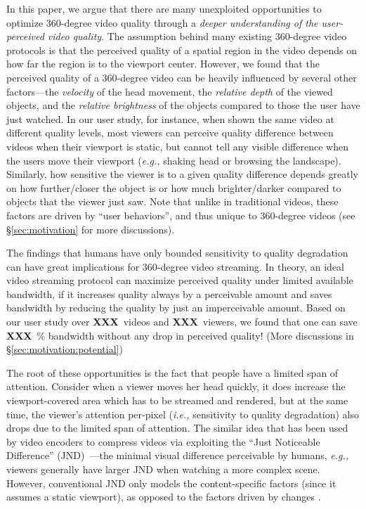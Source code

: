 \documentclass[sigconf]{acmart}
\newcommand{\fillme}{{\bf XXX}~}
\newcommand{\eg}{{\it e.g.,}\xspace}
\newcommand{\ie}{{\it i.e.,}\xspace}
\begin{document}
In this paper, we argue that there are many unexploited opportunities to optimize 360-degree video quality through a {\em deeper understanding of the user-perceived video quality}.
The assumption behind many existing 360-degree video protocols is that the perceived quality of a spatial region in the video depends on how far the region is to the viewport center.
However, we found that the perceived quality of a 360-degree video can be heavily influenced by several other factors---the {\em velocity} of the head movement, the {\em relative depth} of the viewed objects, and the {\em relative brightness} of the objects compared to those the user have just watched. 
In our user study, for instance, when shown the same video at different quality levels, most viewers can perceive quality difference between videos when their viewport is static, but cannot tell any visible difference when the users move their viewport (\eg shaking head or browsing the landscape).
Similarly, how sensitive the viewer is to a given quality difference depends greatly on how further/closer the object is or how much brighter/darker compared to objects that the viewer just saw.
Note that unlike in traditional videos, these factors are driven by ``user behaviors'', and thus unique to 360-degree videos (see \S\ref{sec:motivation} for more discussions).


The findings that humans have only bounded sensitivity to quality degradation can have great implications for 360-degree video streaming. 
In theory, an ideal video streaming protocol can maximize perceived quality under limited available bandwidth, if it increases quality always by a perceivable amount and saves bandwidth by reducing the quality by just an imperceivable amount. 
Based on our user study over \fillme videos and \fillme viewers, we found that one can save \fillme\% bandwidth without any drop in perceived quality! (More discussions in \S\ref{sec:motivation:potential})


The root of these opportunities is the fact that people have a limited span of attention.
Consider when a viewer moves her head quickly, it does increase the viewport-covered area which has to be streamed and rendered, but at the same time, the viewer's attention per-pixel (\ie sensitivity to quality degradation) also drops due to the limited span of attention.
The similar idea that has been used by video encoders to compress videos via exploiting the ``Just Noticeable Difference'' (JND)~\cite{??,??,??}---the minimal visual difference perceivable by humans, \eg viewers generally have larger JND when watching a more complex scene. 
However, conventional JND only models the content-specific factors (since it assumes a static viewport), as opposed to the factors driven by changes . 
\end{document}
